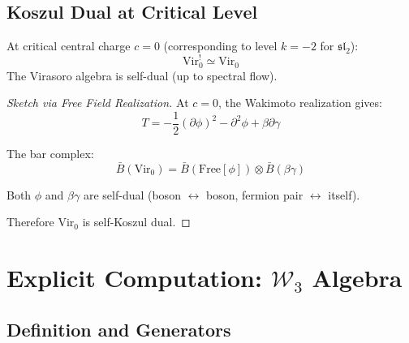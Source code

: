\subsection{Koszul Dual at Critical Level}

\begin{theorem}[Virasoro Self-Duality at $c=0$]
At critical central charge $c = 0$ (corresponding to level $k = -2$ for $\mathfrak{sl}_2$):
\begin{equation}
\text{Vir}_0^! \simeq \text{Vir}_0
\end{equation}
The Virasoro algebra is self-dual (up to spectral flow).
\end{theorem}

\begin{proof}[Sketch via Free Field Realization]
At $c = 0$, the Wakimoto realization gives:
\begin{equation}
T = -\frac{1}{2}(\partial\phi)^2 - \partial^2\phi + \beta\partial\gamma
\end{equation}

The bar complex:
\begin{equation}
\bar{B}(\text{Vir}_0) = \bar{B}(\text{Free}[\phi]) \otimes \bar{B}(\beta\gamma)
\end{equation}

Both $\phi$ and $\beta\gamma$ are self-dual (boson $\leftrightarrow$ boson, fermion pair $\leftrightarrow$ itself).

Therefore $\text{Vir}_0$ is self-Koszul dual.
\end{proof}

\section{Explicit Computation: $\mathcal{W}_3$ Algebra}

\subsection{Definition and Generators}

